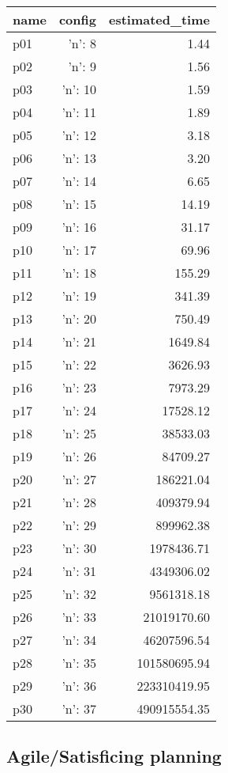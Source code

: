 \documentclass{article}
\begin{document}
                            \begin{center}
                            \scriptsize
                            \begin{tabular}{@{}l|r|r@{}}
                            name & config & estimated\_time\\\midrule
                              p01&{'n': 8}&1.44\\
  p02&{'n': 9}&1.56\\
  p03&{'n': 10}&1.59\\
  p04&{'n': 11}&1.89\\
  p05&{'n': 12}&3.18\\
  p06&{'n': 13}&3.20\\
  p07&{'n': 14}&6.65\\
  p08&{'n': 15}&14.19\\
  p09&{'n': 16}&31.17\\
  p10&{'n': 17}&69.96\\
  p11&{'n': 18}&155.29\\
  p12&{'n': 19}&341.39\\
  p13&{'n': 20}&750.49\\
  p14&{'n': 21}&1649.84\\
  p15&{'n': 22}&3626.93\\
  p16&{'n': 23}&7973.29\\
  p17&{'n': 24}&17528.12\\
  p18&{'n': 25}&38533.03\\
  p19&{'n': 26}&84709.27\\
  p20&{'n': 27}&186221.04\\
  p21&{'n': 28}&409379.94\\
  p22&{'n': 29}&899962.38\\
  p23&{'n': 30}&1978436.71\\
  p24&{'n': 31}&4349306.02\\
  p25&{'n': 32}&9561318.18\\
  p26&{'n': 33}&21019170.60\\
  p27&{'n': 34}&46207596.54\\
  p28&{'n': 35}&101580695.94\\
  p29&{'n': 36}&223310419.95\\
  p30&{'n': 37}&490915554.35
                            \end{tabular}
                            \end{center}
                    

                                \subsection*{Agile/Satisficing planning}
                                
\end{document}
